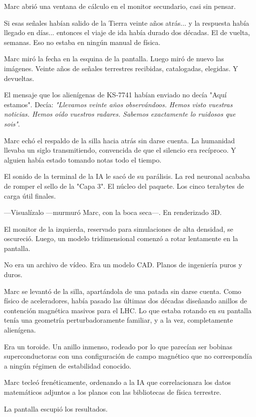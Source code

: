 \documentclass[11pt,a5paper,twoside]{book}
\begin{document}
Marc abrió una ventana de cálculo en el monitor secundario, casi sin pensar.

Si esas señales habían salido de la Tierra veinte años atrás... y la respuesta había llegado en días... entonces el viaje de ida había durado dos décadas. El de vuelta, semanas. Eso no estaba en ningún manual de física.

Marc miró la fecha en la esquina de la pantalla. Luego miró de nuevo las imágenes. Veinte años de señales terrestres recibidas, catalogadas, elegidas. Y devueltas.

El mensaje que los alienígenas de KS-7741 habían enviado no decía "Aquí estamos". Decía: \textit{"Llevamos veinte años observándoos. Hemos visto vuestras noticias. Hemos oído vuestros radares. Sabemos exactamente lo ruidosos que sois"}.

Marc echó el respaldo de la silla hacia atrás sin darse cuenta. La humanidad llevaba un siglo transmitiendo, convencida de que el silencio era recíproco. Y alguien había estado tomando notas todo el tiempo.

El sonido de la terminal de la IA le sacó de su parálisis. La red neuronal acababa de romper el sello de la "Capa 3". El núcleo del paquete. Los cinco terabytes de carga útil finales.

—Visualízalo —murmuró Marc, con la boca seca—. En renderizado 3D.

El monitor de la izquierda, reservado para simulaciones de alta densidad, se oscureció. Luego, un modelo tridimensional comenzó a rotar lentamente en la pantalla.

No era un archivo de vídeo. Era un modelo CAD. Planos de ingeniería puros y duros.

Marc se levantó de la silla, apartándola de una patada sin darse cuenta. Como físico de aceleradores, había pasado las últimas dos décadas diseñando anillos de contención magnética masivos para el LHC. Lo que estaba rotando en su pantalla tenía una geometría perturbadoramente familiar, y a la vez, completamente alienígena.

Era un toroide. Un anillo inmenso, rodeado por lo que parecían ser bobinas superconductoras con una configuración de campo magnético que no correspondía a ningún régimen de estabilidad conocido.

Marc tecleó frenéticamente, ordenando a la IA que correlacionara los datos matemáticos adjuntos a los planos con las bibliotecas de física terrestre.

La pantalla escupió los resultados.
\end{document}
